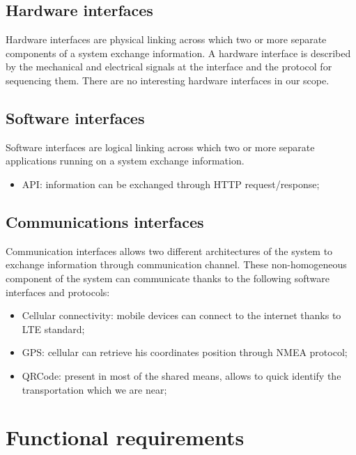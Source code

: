 \subsection{Hardware interfaces}
Hardware interfaces are physical linking across which two or more separate components of a system exchange information. A hardware interface is described by the mechanical and electrical signals at the interface and the protocol for sequencing them. There are no interesting hardware interfaces in our scope.

\subsection{Software interfaces}
Software interfaces are logical linking across which two or more separate applications running on a system exchange information. 
\begin{itemize}
\item API: information can be exchanged through HTTP request/response;
\end{itemize}

\subsection{Communications interfaces}
Communication interfaces allows two different architectures of the system to exchange information through communication channel. These non-homogeneous component of the system can communicate thanks to the following software interfaces and protocols:
\begin{itemize}
\item Cellular connectivity: mobile devices can connect to the internet thanks to LTE standard;
\item GPS: cellular can retrieve his coordinates position through NMEA protocol;
\item QRCode: present in most of the shared means, allows to quick identify the transportation which we are near;
\end{itemize}


\section{Functional requirements}
